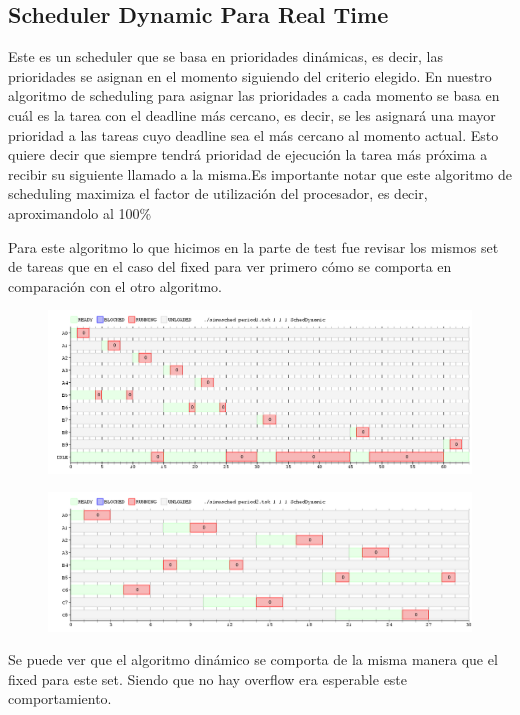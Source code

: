 \subsection{Scheduler Dynamic Para Real Time}
Este es un scheduler que se basa en prioridades dinámicas, es decir, las prioridades se asignan en el momento siguiendo del criterio elegido. En nuestro algoritmo de scheduling para asignar las prioridades a cada momento se basa en cuál es la tarea con el deadline más cercano, es decir, se les asignará una mayor prioridad a las tareas cuyo deadline sea el más cercano al momento actual. Esto quiere decir que siempre tendrá prioridad de ejecución la tarea más próxima a recibir su siguiente llamado a la misma.Es importante notar que este algoritmo de scheduling maximiza el factor de utilización del procesador, es decir, aproximandolo al 100\%

Para este algoritmo lo que hicimos en la parte de test fue revisar los mismos set de tareas que en el caso del fixed para ver primero cómo se comporta en comparación con el otro algoritmo.


\begin{figure}[H]
  \centering
\includegraphics[scale=0.45]{dynamic/period1D.png}
  \caption[Algoritmo Fixed]{}
\end{figure}

\begin{figure}[H]
  \centering
\includegraphics[scale=0.45]{dynamic/period2D.png}
  \caption[Algoritmo Dinamico]{}
\end{figure}

Se puede ver que el algoritmo dinámico se comporta de la misma manera que el fixed para este set. Siendo que no hay overflow era esperable este comportamiento.

